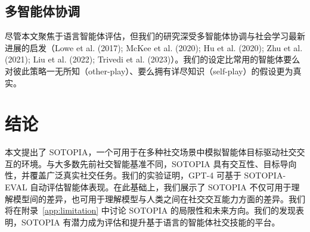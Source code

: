 \documentclass[11pt,a4paper]{article}
\begin{document}
\subsection*{多智能体协调}

尽管本文聚焦于语言智能体评估，但我们的研究深受多智能体协调与社会学习最新进展的启发（Lowe et al. (2017); McKee et al. (2020); Hu et al. (2020); Zhu et al. (2021); Liu et al. (2022); Trivedi et al. (2023)）。我们的设定比常用的智能体要么对彼此策略一无所知（other-play）、要么拥有详尽知识（self-play）的假设更为真实。

\section{结论}

本文提出了 SOTOPIA，一个可用于在多种社交场景中模拟智能体目标驱动社交交互的环境。与大多数先前社交智能基准不同，SOTOPIA 具有交互性、目标导向性，并覆盖广泛真实社交任务。我们的实验证明，GPT-4 可基于 SOTOPIA-EVAL 自动评估智能体表现。在此基础上，我们展示了 SOTOPIA 不仅可用于理解模型间的差异，也可用于理解模型与人类之间在社交交互能力方面的差异。我们将在附录~\ref{app:limitation} 中讨论 SOTOPIA 的局限性和未来方向。我们的发现表明，SOTOPIA 有潜力成为评估和提升基于语言的智能体社交技能的平台。
\end{document}
